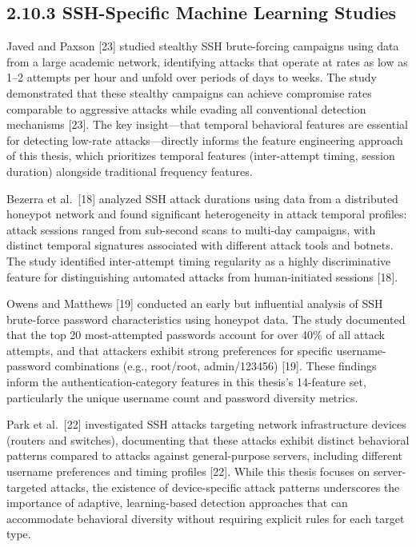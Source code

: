 \documentclass[
  a4paper]{report}
\begin{document}
\subsection{2.10.3 SSH-Specific Machine Learning
Studies}\label{ssh-specific-machine-learning-studies}

Javed and Paxson {[}23{]} studied stealthy SSH brute-forcing campaigns
using data from a large academic network, identifying attacks that
operate at rates as low as 1--2 attempts per hour and unfold over
periods of days to weeks. The study demonstrated that these stealthy
campaigns can achieve compromise rates comparable to aggressive attacks
while evading all conventional detection mechanisms {[}23{]}. The key
insight---that temporal behavioral features are essential for detecting
low-rate attacks---directly informs the feature engineering approach of
this thesis, which prioritizes temporal features (inter-attempt timing,
session duration) alongside traditional frequency features.

Bezerra et al.~{[}18{]} analyzed SSH attack durations using data from a
distributed honeypot network and found significant heterogeneity in
attack temporal profiles: attack sessions ranged from sub-second scans
to multi-day campaigns, with distinct temporal signatures associated
with different attack tools and botnets. The study identified
inter-attempt timing regularity as a highly discriminative feature for
distinguishing automated attacks from human-initiated sessions {[}18{]}.

Owens and Matthews {[}19{]} conducted an early but influential analysis
of SSH brute-force password characteristics using honeypot data. The
study documented that the top 20 most-attempted passwords account for
over 40\% of all attack attempts, and that attackers exhibit strong
preferences for specific username-password combinations (e.g.,
root/root, admin/123456) {[}19{]}. These findings inform the
authentication-category features in this thesis's 14-feature set,
particularly the unique username count and password diversity metrics.

Park et al.~{[}22{]} investigated SSH attacks targeting network
infrastructure devices (routers and switches), documenting that these
attacks exhibit distinct behavioral patterns compared to attacks against
general-purpose servers, including different username preferences and
timing profiles {[}22{]}. While this thesis focuses on server-targeted
attacks, the existence of device-specific attack patterns underscores
the importance of adaptive, learning-based detection approaches that can
accommodate behavioral diversity without requiring explicit rules for
each target type.
\end{document}
